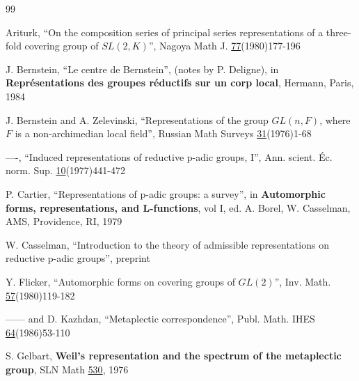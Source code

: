 \documentclass[twocolumn,10pt]{article}
\begin{document}
\begin{thebibliography}{99}

 Ariturk, ``On the composition series of principal series
representations of a three-fold covering group of $SL(2,K)$'', Nagoya Math
J. \underline{77}(1980)177-196

 J. Bernstein, ``Le centre de Bernstein'', 
(notes by P. Deligne), 
in {\bf Repr\'esentations des groupes r\'eductifs 
sur un corp local}, Hermann, Paris, 1984

 J. Bernstein and A. Zelevinski, ``Representations of 
the group $GL(n,F)$,
where $F$ is a non-archimedian local field'', Russian Math Surveys
\underline{31}(1976)1-68

 ----, ``Induced representations of reductive p-adic 
groups, I'', Ann.
scient. \'Ec. norm. Sup. \underline{10}(1977)441-472




 P. Cartier, ``Representations of p-adic groups: a survey'',
in {\bf Automorphic forms, representations, and L-functions},
vol I, ed. A. Borel, W. Casselman, AMS, Providence, RI, 1979

 W. Casselman, ``Introduction to the theory of admissible
representations on reductive p-adic groups'', preprint

 Y. Flicker, ``Automorphic forms on covering groups of 
$GL(2)$'', Inv. Math. \underline{57}(1980)119-182

 ------ and D. Kazhdan, ``Metaplectic 
correspondence'', Publ. Math. IHES \underline{64}(1986)53-110

 S. Gelbart, {\bf Weil's representation and the 
spectrum of the metaplectic group},
SLN Math \underline{530}, 1976



\end{thebibliography}
\end{document}
